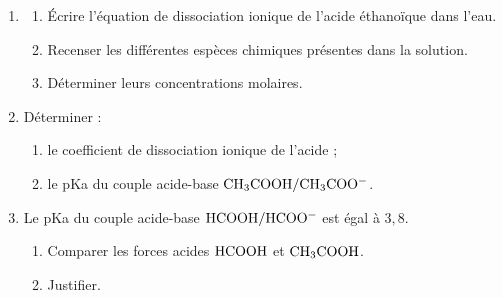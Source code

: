 \documentclass[11pt]{article}
\begin{document}
\begin{enumerate}
  \item \begin{enumerate}[label=\alph*.]
    \item Écrire l'équation de dissociation ionique de l'acide éthanoïque dans l'eau.
    \item Recenser les différentes espèces chimiques présentes dans la solution.
    \item Déterminer leurs concentrations molaires.
  \end{enumerate}
  \item Déterminer :
  \begin{enumerate}[label=\alph*.]
    \item le coefficient de dissociation ionique de l'acide ;
    \item le pKa du couple acide-base $\mathrm{CH_3COOH/CH_3COO^-}$.
  \end{enumerate}
  \item Le pKa du couple acide-base $\mathrm{HCOOH/HCOO^-}$ est égal à $3{,}8$.
  \begin{enumerate}[label=\alph*.]
    \item Comparer les forces acides $\mathrm{HCOOH}$ et $\mathrm{CH_3COOH}$.
    \item Justifier.
  \end{enumerate}
\end{enumerate}
\end{document}
